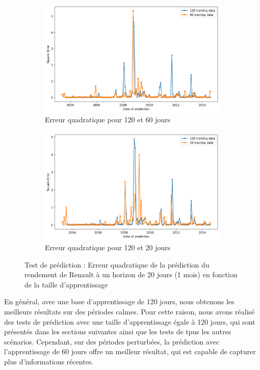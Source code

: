\begin{figure}[H]
\centering
\begin{subfigure}{.5\textwidth}
\centering
\includegraphics[width=.9\linewidth, scale=0.2]
{plot/Predict1.png}
\caption{Erreur quadratique pour 120 et 60 jours}
\label{fig:p1}
\end{subfigure}%
\begin{subfigure}{.5\textwidth}
\centering
\includegraphics[width=.9\linewidth, scale=0.2]
{plot/Predict2.png}
\caption{Erreur quadratique pour 120 et 20 jours}
\label{fig:p2}
\end{subfigure}
\caption{Test de prédiction : Erreur quadratique de la prédiction du rendement de Renault à un horizon de 20 jours (1 mois) en fonction de la taille d'apprentissage}
\label{fig:tp_mse}
\end{figure}

En général, avec une base d'apprentissage de 120 jours, nous obtenons les meilleurs résultats sur des périodes calmes. Pour cette raison, nous avons réalisé des tests de prédiction avec une taille d'apprentissage égale à 120 jours, qui sont présentés dans les sections suivantes ainsi que les tests de tpus les autres scénarios. Cependant, sur des périodes perturbées, la prédiction avec l'apprentissage de 60 jours offre un meilleur résultat, qui est capable de capturer plus d'informations récentes.\\

